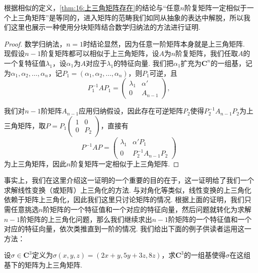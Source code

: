 根据相似的定义，\autoref{thm:16:上三角矩阵存在}的结论与``任意$n$阶复矩阵一定相似于一个上三角矩阵''是等同的，进入矩阵的范畴我们如同从抽象的表达中解脱，所以我们这里也展示一种使用分块矩阵结合数学归纳法的方法进行证明.
\begin{proof}
    数学归纳法，$n=1$时结论显然，因为任意一阶矩阵本身就是上三角矩阵. 现假设$n-1$阶复矩阵都可以相似于上三角矩阵，设$A$为$n$阶复矩阵，我们任取$A$的一个复特征值$\lambda_1$，设$\alpha_1$为$A$对应于$\lambda_1$的特征向量. 我们把$\alpha_1$扩充为$\mathbf{C}^n$的一组基，记为$\alpha_1,\alpha_2,\ldots,\alpha_n$，记$P_1=(\alpha_1,\alpha_2,\ldots,\alpha_n)$，则$P_1$可逆，且
            \[P_1^{-1}AP_1=\begin{pmatrix}
                    \lambda_1 & \alpha' \\ 0 & A_{n-1}
                \end{pmatrix},\]

            我们对$n-1$阶矩阵$A_{n-1}$应用归纳假设，因此存在可逆矩阵$P_2$使得$P_2^{-1}A_{n-1}P_2$为上三角矩阵，取$P=P_1\begin{pmatrix}
                    1 & 0 \\ 0 & P_2
                \end{pmatrix}$，直接有
            \[P^{-1}AP=\begin{pmatrix}
                    \lambda_1 & \alpha'P_1 \\ 0 & P_2^{-1}A_{n-1}P_2
                \end{pmatrix}\]
            为上三角矩阵，因此$n$阶复矩阵一定相似于上三角矩阵.
\end{proof}

事实上，我们在这里介绍这一证明的一个重要的目的在于，这一证明给了我们一个求解线性变换（或矩阵）上三角化的方法. 与对角化等类似，线性变换的上三角化依赖于矩阵上三角化，因此我们这里只讨论矩阵的情况. 根据上面的证明，我们只需任意挑选$n$阶矩阵的一个特征值和一个对应的特征向量，然后问题就转化为求解$n-1$阶矩阵的上三角化问题，那么我们继续求出$n-1$阶矩阵的一个特征值和一个对应的特征向量，依次类推直到一阶的情况. 我们给出下面的例子供读者运用这一方法：
\begin{example}
    设$\sigma\in\mathbf{C}^3$定义为$\sigma(x,y,z)=(2x+y,5y+3z,8z)$，求$\mathbf{C}^3$的一组基使得$\sigma$在这组基下的矩阵为上三角矩阵.
\end{example}

\begin{solution}

\end{solution}

